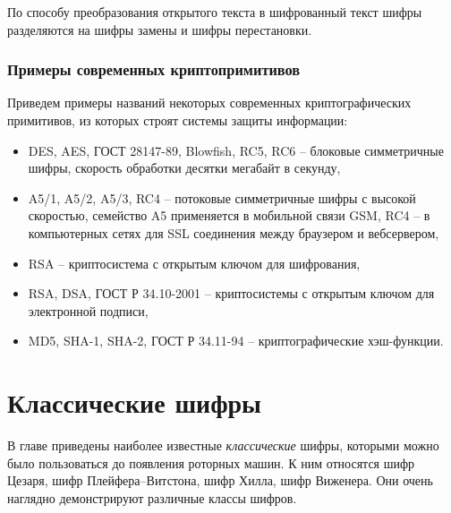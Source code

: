 \documentclass[10pt,a4paper]{book}
\begin{document}
По способу преобразования открытого текста в шифрованный текст шифры разделяются на шифры замены и шифры перестановки.







\subsection{Примеры современных криптопримитивов}

Приведем примеры названий некоторых современных криптографических примитивов, из которых строят системы защиты информации:
\begin{itemize}
    \item DES, AES, ГОСТ 28147-89, Blowfish, RC5, RC6 -- блоковые симметричные шифры, скорость обработки десятки мегабайт в секунду,
    \item A5/1, A5/2, A5/3, RC4 -- потоковые симметричные шифры с высокой скоростью, семейство A5 применяется в мобильной связи GSM, RC4 -- в компьютерных сетях для SSL соединения между браузером и вебсервером,
    \item RSA -- криптосистема с открытым ключом для шифрования,
    \item RSA, DSA, ГОСТ Р 34.10-2001 -- криптосистемы с открытым ключом для электронной подписи,
    \item MD5, SHA-1, SHA-2, ГОСТ Р 34.11-94 -- криптографические хэш-функции.
\end{itemize}





\chapter{Классические шифры}

В главе приведены наиболее известные \emph{классические} шифры, которыми можно было пользоваться до появления роторных машин. К ним относятся шифр Цезаря, шифр Плейфера--Витстона, шифр Хилла, шифр Виженера. Они очень наглядно демонстрируют различные классы шифров.






\end{document}
